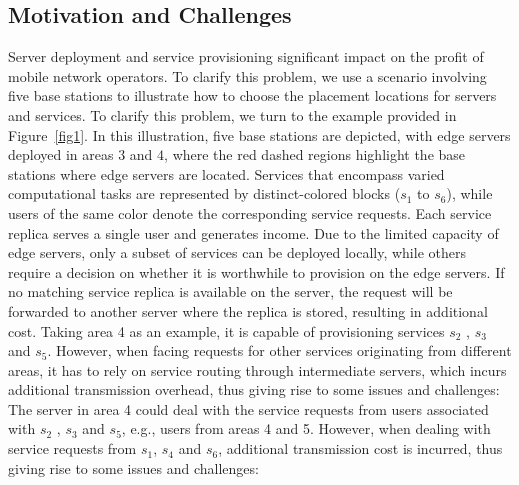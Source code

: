 \documentclass[10pt, conference, letterpaper]{IEEEtran}
\begin{document}
\subsection{Motivation and Challenges}
Server deployment and service provisioning significant impact on the profit of mobile network operators. To clarify this problem, we use a scenario involving five base stations to illustrate how to choose the placement locations for servers and services.
To clarify this problem, we turn to the example provided in Figure~\ref{fig1}. In this illustration, five base stations are depicted, with edge servers deployed in areas $3$ and $4$, where the red dashed regions highlight the base stations where edge servers are located. Services that encompass varied computational tasks are represented by distinct-colored blocks ($s_{1}$ to $s_{6}$), while users of the same color denote the corresponding service requests. 
Each service replica serves a single user and generates income. Due to the limited capacity of edge servers, only a subset of services can be deployed locally, while others require a decision on whether it is worthwhile to provision on the edge servers. If no matching service replica is available on the server, the request will be forwarded to another server where the replica is stored, resulting in additional cost. Taking area 4 as an example, it is capable of provisioning services $s_2$ , $s_3$ and $s_5$. However, when facing requests for other services originating from different areas, it has to rely on service routing through intermediate servers, which incurs additional transmission overhead, thus giving rise to some issues and challenges:
The server in area 4 could deal with the service requests from users associated with $s_2$ , $s_3$ and $s_5$, e.g., users from areas 4 and 5. 
However, when dealing with service requests from $s_{1}$, $s_{4}$ and $s_{6}$, additional transmission cost is incurred, thus giving rise to some issues and challenges: 
\end{document}
